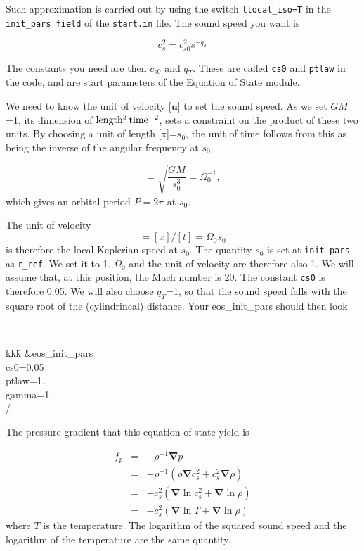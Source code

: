 \documentclass[a4paper,10pt]{article}
\renewcommand{\v}[1]{{\boldsymbol #1}} %
\newcommand{\del}{\v{\nabla}}
\newcommand{\grad}{\del}
\begin{document}
Such approximation is carried out by using the switch {\tt llocal\_iso=T} in the {\tt init\_pars field} of the {\tt start.in} file. The sound speed you want is 

\begin{equation}
c_s^2=c_{s0}^2 s^{-q_T}
\end{equation}

The constants you need are then $c_{s0}$ and $q_T$. These are called {\tt cs0} and {\tt ptlaw} in the code, and are start parameters of the Equation of State module. 

We need to know the unit of velocity [$\v{u}$] to set the sound speed. As we set $GM$=1, its dimension of $\rm{length^3\,time^{-2}}$, sets a constraint on the product of these two units. By choosing a unit of length [x]=$s_0$, the unit of time follows from this as being the inverse of the angular frequency at $s_0$

\begin{equation}
[t] = \sqrt{\frac{GM}{s_0^3}} = \Omega_0^{-1},
\end{equation}which gives an orbital period $P=2\pi$ at $s_0$.

The unit of velocity 
\begin{equation}
[\v{u}]=[x]/[t]=\Omega_0 s_0
\end{equation}is therefore the local
Keplerian speed at $s_0$. The quantity $s_0$ is set at {\tt init\_pars} as {\tt r\_ref}. We set it to 1. $\Omega_0$ and the unit of velocity are therefore also 1. We will assume that, at this position, the Mach number is 20. The constant {\tt cs0} is therefore 0.05. We will also choose $q_T$=1, so that the sound speed falls with the square root of the (cylindrincal) distance. Your eos\_init\_pars should then look

{\tt 
\begin{tabbing}
  kkk\=\kill
\&eos\_init\_pars\\
  \>cs0=0.05\\
  \>ptlaw=1.\\
  \>gamma=1.\\
/
\end{tabbing}
}


The pressure gradient that this equation of state yield is 

\begin{eqnarray}
f_p&=&-\rho^{-1} \grad{p} \\
   &=& -\rho^{-1}\left(\rho \grad{c_s^2} + c_s^2\grad{\rho}\right)\\
   &=&  -c_s^2\left(\grad{\ln c_s^2} + \grad{\ln \rho}\right)  \\
   &=& -c_s^2\left(\grad{\ln T} + \grad{\ln \rho}\right)   \nonumber
\end{eqnarray}where $T$ is the temperature. The logarithm of the squared sound speed and the logarithm of the temperature are the same quantity.
\end{document}
